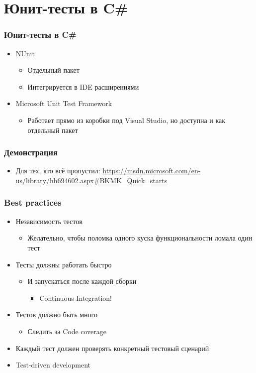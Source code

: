 \documentclass[xetex,mathserif,serif]{beamer}
\begin{document}
	\section{Юнит-тесты в C\#}

	\begin{frame}
		\frametitle{Юнит-тесты в C\#}
		\begin{itemize}
			\item NUnit
			\begin{itemize}
				\item Отдельный пакет
				\item Интегрируется в IDE расширениями
			\end{itemize}
			\item Microsoft Unit Test Framework
			\begin{itemize}
				\item Работает прямо из коробки под Visual Studio, но доступна и как отдельный пакет
			\end{itemize}
		\end{itemize}
	\end{frame}

	\begin{frame}
		\frametitle{Демонстрация}
		\begin{itemize}
			\item Для тех, кто всё пропустил: \url{https://msdn.microsoft.com/en-us/library/hh694602.aspx\#BKMK\_Quick\_starts}
		\end{itemize}
	\end{frame}

	\begin{frame}
		\frametitle{Best practices}
		\begin{itemize}
			\item Независимость тестов
			\begin{itemize}
				\item Желательно, чтобы поломка одного куска функциональности ломала один тест
			\end{itemize}
			\item Тесты должны работать быстро
			\begin{itemize}
				\item И запускаться после каждой сборки
				\begin{itemize}
					\item Continuous Integration!
				\end{itemize}
			\end{itemize}
			\item Тестов должно быть много
			\begin{itemize}
				\item Следить за Code coverage
			\end{itemize}
			\item Каждый тест должен проверять конкретный тестовый сценарий
			\item Test-driven development
		\end{itemize}
	\end{frame}
\end{document}
